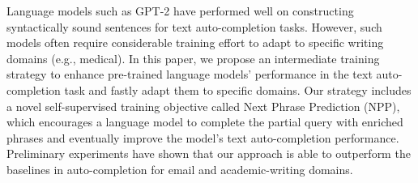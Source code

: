 Language models such as GPT-2 have performed well on constructing syntactically sound sentences for text auto-completion tasks. However, such models often require considerable training effort to adapt to specific writing domains (e.g., medical). In this paper, we propose an intermediate training strategy to enhance pre-trained language models' performance in the text auto-completion task and fastly adapt them to specific domains. Our strategy includes a novel self-supervised training objective called Next Phrase Prediction (NPP), which encourages a language model to complete the partial query with enriched phrases and eventually improve the model's text auto-completion performance. Preliminary experiments have shown that our approach is able to outperform the baselines in auto-completion for email and academic-writing domains.
